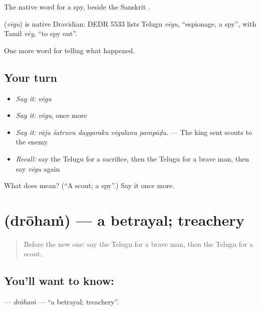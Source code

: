 The native word for a spy, beside the Sanskrit .

\begin{cousinweb}
\textbf{} (\emph{vēgu}) is native Dravidian: DEDR 5533 lists Telugu \emph{vēgu}, \textquotedblleft{}espionage, a spy\textquotedblright{}, with Tamil \emph{vēy}, \textquotedblleft{}to spy out\textquotedblright{}.
\end{cousinweb}

\begin{grammarlens}[title={What you've built}]
One more word for telling what happened.
\end{grammarlens}

\subsection*{Your turn}
\begin{itemize}
\raggedright
  \item \emph{Say it:} \emph{vēgu}
  \item \emph{Say it:} \emph{vēgu}, once more
  \item \emph{Say it:} \emph{rāju śatruvu daggaraku vēgulanu pampāḍu.} — The king sent scouts to the enemy.
  \item \emph{Recall:} say the Telugu for a sacrifice, then the Telugu for a brave man, then say \emph{vēgu} again
\end{itemize}

\begin{tcolorbox}[breakable,colback=teal!4,colframe=teal!35!black,title={Before you move on}]
What does  mean? (\textquotedblleft{}A scout; a spy\textquotedblright{}.) Say it once more.
\end{tcolorbox}
\section[\texorpdfstring{\te{ద్రోహం} (drōhaṁ)}{ద్రోహం (drōhaṁ)}]{ (drōhaṁ) — a betrayal; treachery}

\label{lesson:TE-C365-droham}



\begin{quote}
Before the new one: say the Telugu for a brave man, then the Telugu for a scout.
\end{quote}

\subsection*{You'll want to know: }
\textbf{} — \emph{drōhaṁ} — \textquotedblleft{}a betrayal; treachery\textquotedblright{}.

